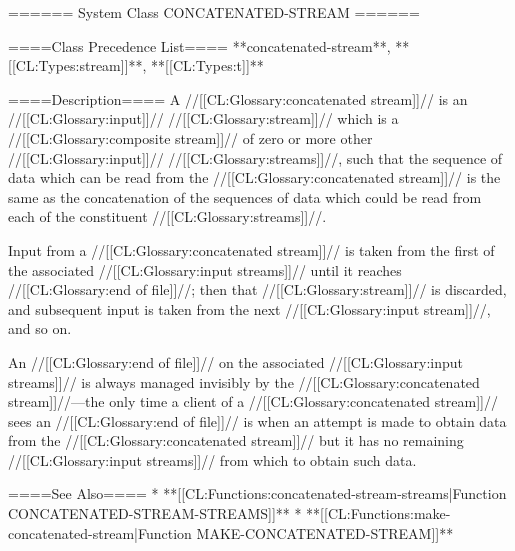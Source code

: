 ====== System Class CONCATENATED-STREAM ======

====Class Precedence List====
**concatenated-stream**, **[[CL:Types:stream]]**, **[[CL:Types:t]]**

====Description====
A //[[CL:Glossary:concatenated stream]]// is an //[[CL:Glossary:input]]// //[[CL:Glossary:stream]]// which is a //[[CL:Glossary:composite stream]]// of zero or more other //[[CL:Glossary:input]]// //[[CL:Glossary:streams]]//, such that the sequence of data which can be read from the //[[CL:Glossary:concatenated stream]]// is the same as the concatenation of the sequences of data which could be read from each of the constituent //[[CL:Glossary:streams]]//.

Input from a //[[CL:Glossary:concatenated stream]]// is taken from the first of the associated //[[CL:Glossary:input streams]]// until it reaches //[[CL:Glossary:end of file]]//; then that //[[CL:Glossary:stream]]// is discarded, and subsequent input is taken from the next //[[CL:Glossary:input stream]]//, and so on.

An //[[CL:Glossary:end of file]]// on the associated //[[CL:Glossary:input streams]]// is always managed invisibly by the //[[CL:Glossary:concatenated stream]]//---the only time a client of a //[[CL:Glossary:concatenated stream]]// sees an //[[CL:Glossary:end of file]]// is when an attempt is made to obtain data from the //[[CL:Glossary:concatenated stream]]// but it has no remaining //[[CL:Glossary:input streams]]// from which to obtain such data.

====See Also====
  * **[[CL:Functions:concatenated-stream-streams|Function CONCATENATED-STREAM-STREAMS]]**
  * **[[CL:Functions:make-concatenated-stream|Function MAKE-CONCATENATED-STREAM]]**

 
